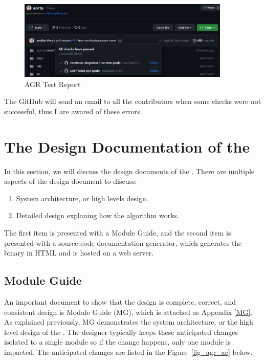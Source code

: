 \begin{figure}[H]
    \centering
    \includegraphics[width=0.9\textwidth]{figures/AC/GI/test_report.png}
    \caption[AGR Test Report]{AGR Test Report}
    \label{fig_agr_test_report}
\end{figure}

The GitHub will send an email to all the contributors when some checks were not successful, thus I are awared of these errors.

\section{The Design Documentation of the \progname{}}

In this section, we will discuss the design documents of the \progname{}. There are multiple aspects of the design document to discuss:

\begin{enumerate}
\item System architecture, or high levels design.
\item Detailed design explaning how the algorithm works.
\end{enumerate}

The first item is presented with a Module Guide, and the second item is presented with a source code documentation generator, which generates the binary in HTML and is hosted on a web server.

\subsection{Module Guide}

An important document to show that the design is complete, correct, and consistent design is Module Guide (MG), which  is attached as Appendix \ref{MG}. As explained previously, MG demonstrates the system architecture, or the high level design of the \progname{}. The designer typically keeps these anticipated changes isolated to a single module so if the change happens, only one module is impacted. The anticipated changes are listed in the Figure~\ref{fig_agr_ac} below.

